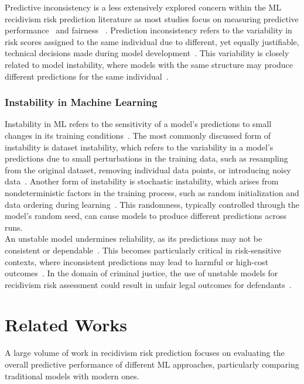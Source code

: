 \documentclass[12pt]{article}
\begin{document}
Predictive inconsistency is a less extensively explored concern within the ML recidivism risk prediction literature as most studies focus on measuring predictive performance~\cite{duwe2017out, travaini2022machine, tollenaar2013method} and fairness~\cite{ tolan2019machine, dressel2018accuracy,ngo2018traditional} . Prediction inconsistency refers to the variability in risk scores assigned to the same individual due to different, yet equally justifiable, technical decisions made during model development~\cite{greene2022forks}. This variability is closely related to model instability, where models with the same structure may produce different predictions for the same individual~\cite{greene2022forks}.

\subsubsection{Instability in Machine Learning}
\tab Instability in ML refers to the sensitivity of a model's predictions to small changes in its training conditions~\cite{sun2015stability}. The most commonly discussed form of instability is dataset instability, which refers to the variability in a model's predictions due to small perturbations in the training data, such as resampling from the original dataset, removing individual data points, or introducing noisy data~\cite{riley2023stability,hardt2016train}. Another form of instability is stochastic instability, which arises from nondeterministic factors in the training process, such as random initialization and data ordering during learning~\cite{lopez2022instability}. This randomness, typically controlled through the model's random seed, can cause models to produce different predictions across runs.\\

An unstable model undermines reliability, as its predictions may not be consistent or dependable~\cite{riley2023stability}. This becomes particularly critical in risk-sensitive contexts, where inconsistent predictions may lead to harmful or high-cost outcomes~\cite{zhang2024reliability}. In the domain of criminal justice, the use of unstable models for recidivism risk assessment could result in unfair legal outcomes for defendants~\cite{greene2022forks}.


\section{Related Works}
\tab A large volume of work in recidivism risk prediction focuses on evaluating the overall predictive performance of different ML approaches, particularly comparing traditional models with modern ones.\\
\end{document}
